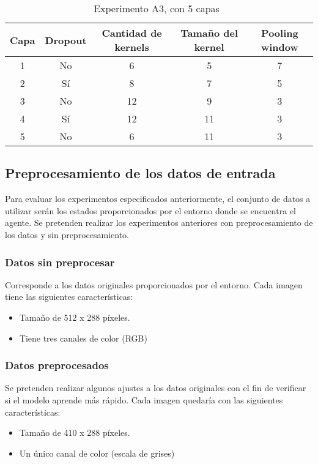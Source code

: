 \documentclass[journal]{IEEEtran}
\begin{document}
    
    \begin{table}[h!]
    \centering
    \begin{tabular}{@{}ccccc@{}}
    \toprule
    Capa & Dropout & Cantidad de kernels & Tamaño del kernel & Pooling window \\ \midrule
    1     & No      & 6                   & 5                 & 7              \\
    2     & Sí      & 8                   & 7                 & 5              \\
    3     & No      & 12                  & 9                 & 3              \\
    4     & Sí      & 12                  & 11                & 3              \\
    5     & No      & 6                   & 11                & 3              \\ \bottomrule
    \end{tabular}
    \caption{Experimento A3, con 5 capas~\label{expA3}}
    \end{table}
    
    
\subsection{Preprocesamiento de los datos de entrada}
    Para evaluar los experimentos especificados anteriormente, el conjunto de datos a utilizar serán los estados proporcionados por el entorno donde se encuentra el agente. Se pretenden realizar los experimentos anteriores con preprocesamiento de los datos y sin preprocesamiento.
    \subsubsection{Datos sin preprocesar}
        Corresponde a los datos originales proporcionados por el entorno. Cada imagen tiene las siguientes características:
        \begin{itemize}
            \item Tamaño de 512 x 288 píxeles.
            \item Tiene tres canales de color (RGB)
        \end{itemize}
    \subsubsection{Datos preprocesados}
        Se pretenden realizar algunos ajustes a los datos originales con el fin de verificar si el modelo aprende más rápido. Cada imagen quedaría con las siguientes características:
        \begin{itemize}
            \item Tamaño de 410 x 288 píxeles.
            \item Un único canal de color (escala de grises)
        \end{itemize}
\end{document}
